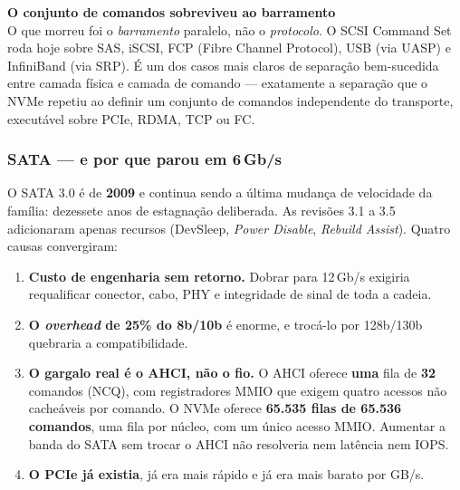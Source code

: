 \documentclass[11pt,a4paper]{article}
\newcommand{\destaque}[2]{%
  \begin{center}\begin{minipage}{0.96\textwidth}
  \colorbox{fundo}{\begin{minipage}{\dimexpr\linewidth-2\fboxsep}
  \vspace{3pt}\textbf{\color{azul}#1}\\[2pt]\small #2\vspace{4pt}
  \end{minipage}}\end{minipage}\end{center}}
\begin{document}
\destaque{O conjunto de comandos sobreviveu ao barramento}{%
O que morreu foi o \emph{barramento} paralelo, não o \emph{protocolo}. O SCSI Command Set
roda hoje sobre SAS, iSCSI, FCP (Fibre Channel Protocol), USB (via UASP) e InfiniBand (via
SRP). É um dos casos mais claros de separação bem-sucedida entre camada física e camada de
comando --- exatamente a separação que o NVMe repetiu ao definir um conjunto de comandos
independente do transporte, executável sobre PCIe, RDMA, TCP ou FC.}

\subsubsection{SATA --- e por que parou em 6\,Gb/s}

O SATA 3.0 é de \textbf{2009} e continua sendo a última mudança de velocidade da família:
dezessete anos de estagnação deliberada. As revisões 3.1 a 3.5 adicionaram apenas recursos
(DevSleep, \emph{Power Disable}, \emph{Rebuild Assist}). Quatro causas convergiram:

\begin{enumerate}
\item \textbf{Custo de engenharia sem retorno.} Dobrar para 12\,Gb/s exigiria requalificar
      conector, cabo, PHY e integridade de sinal de toda a cadeia.
\item \textbf{O \emph{overhead} de 25\% do 8b/10b} é enorme, e trocá-lo por 128b/130b
      quebraria a compatibilidade.
\item \textbf{O gargalo real é o AHCI, não o fio.} O AHCI oferece \textbf{uma} fila de
      \textbf{32} comandos (NCQ), com registradores MMIO que exigem quatro acessos não
      cacheáveis por comando. O NVMe oferece \textbf{65.535 filas de 65.536 comandos},
      uma fila por núcleo, com um único acesso MMIO. Aumentar a banda do SATA sem trocar o
      AHCI não resolveria nem latência nem IOPS.
\item \textbf{O PCIe já existia}, já era mais rápido e já era mais barato por GB/s.
\end{enumerate}
\end{document}
